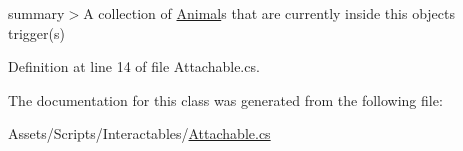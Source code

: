 summary$>$A collection of \mbox{\hyperlink{class_animal}{Animal}}s that are currently inside this object\textquotesingle{}s trigger(s)



Definition at line 14 of file Attachable.\+cs.



The documentation for this class was generated from the following file\+:\begin{DoxyCompactItemize}
\item 
Assets/\+Scripts/\+Interactables/\mbox{\hyperlink{_attachable_8cs}{Attachable.\+cs}}\end{DoxyCompactItemize}
